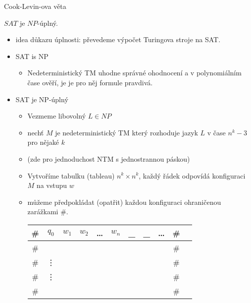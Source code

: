    
    \begin{frame}{Cook-Levin-ova věta}
    
    \begin{theorem}
    $SAT$ je $NP$-úplný.
    \end{theorem}
    \begin{itemize}
        \item idea důkazu úplnosti: převedeme výpočet Turingova stroje na SAT.
    \end{itemize}
    \end{frame}
    
    
    \begin{frame}{}
    \begin{proofs}
    \begin{itemize}
        \item SAT is NP
        
        \begin{itemize}
            \item Nedeterministický TM uhodne správné ohodnocení a v polynomiálním čase ověří, je je pro něj formule pravdivá.
        \end{itemize}
    \pause
     \item SAT je NP-úplný
        
        \begin{itemize}[<+->]
            \item Vezmeme libovolný $L\in NP$
            \item nechť $M$ je nedeterministický TM který rozhoduje jazyk $L$ v čase $n^k-3$ pro nějaké $k$ 
      \item (zde pro jednoduchost NTM s jednostrannou páskou)
            \item Vytvoříme tabulku (tableau) $n^k\times n^k$, každý řádek odpovídá konfiguraci $M$ na vstupu $w$
            \item můžeme předpokládat (opatřit) každou konfiguraci ohraničenou zarážkami $\#$.
        
            \begin{tabular}{|c|c|c|c|c|c|c|c|c|c|c|}\hline
            \# & $q_0$ & $w_1$ &$w_2$ & \ldots &$w_n$ & \_  &\_  &  \ldots &\# \\\hline
            \# &       &       &       &       &       &       &       &  &\# \\\hline
            \# & \vdots &       &       &       &       &       &       &&\# \\
            \# & \vdots &       &       &       &       &       &       &&\# \\\hline
            \# &       &       &       &       &       &       &       &  &\# \\\hline
                

\end{tabular}
\end{itemize}
\end{itemize}
\end{proofs}
\end{frame}
